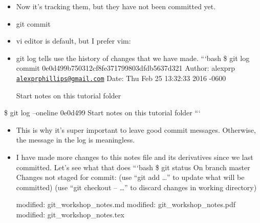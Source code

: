 \documentclass[10pt,]{article}
\newenvironment{Shaded}{}{}
\newcommand{\KeywordTok}[1]{\textcolor[rgb]{0.00,0.44,0.13}{\textbf{{#1}}}}
\newcommand{\StringTok}[1]{\textcolor[rgb]{0.25,0.44,0.63}{{#1}}}
\newcommand{\NormalTok}[1]{{#1}}
\begin{document}
\begin{itemize}
\item
  Now it's tracking them, but they have not been committed yet.
\item
  git commit

\begin{Shaded}
\end{Shaded}
\item
  vi editor is default, but I prefer vim:

\begin{Shaded}
\end{Shaded}
\item
  git log tells use the history of changes that we have made. ```bash \$
  git log commit 0e0d499b750312cf8fe371799803dfdb5637d321 Author:
  alexprp
  \href{mailto:alexprphillips@gmail.com}{\nolinkurl{alexprphillips@gmail.com}}
  Date: Thu Feb 25 13:32:33 2016 -0600

  Start notes on this tutorial folder
\end{itemize}

\$ git log --oneline 0e0d499 Start notes on this tutorial folder ```

\begin{itemize}
\item
  This is why it's super important to leave good commit messages.
  Otherwise, the message in the log is meaningless.
\item
  I have made more changes to this notes file and its derivatives since
  we last committed. Let's see what that does ```bash \$ git status On
  branch master Changes not staged for commit: (use ``git add \ldots{}''
  to update what will be committed) (use ``git checkout -- \ldots{}'' to
  discard changes in working directory)

  modified: git\_workshop\_notes.md modified: git\_workshop\_notes.pdf
  modified: git\_workshop\_notes.tex
\end{itemize}
\end{document}
